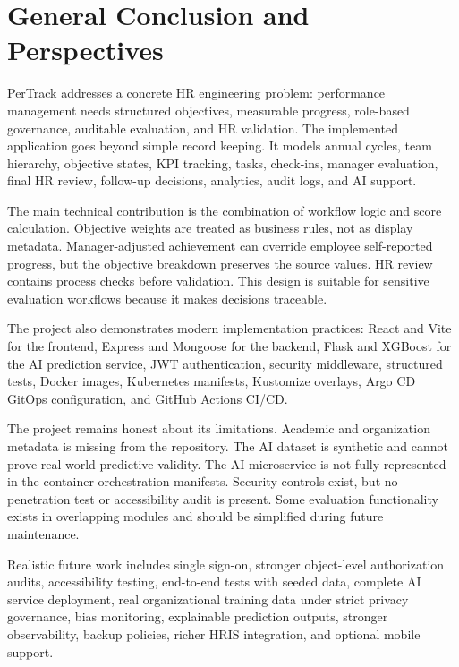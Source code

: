 \chapter*{General Conclusion and Perspectives}
PerTrack addresses a concrete HR engineering problem: performance management needs structured objectives, measurable progress, role-based governance, auditable evaluation, and HR validation. The implemented application goes beyond simple record keeping. It models annual cycles, team hierarchy, objective states, KPI tracking, tasks, check-ins, manager evaluation, final HR review, follow-up decisions, analytics, audit logs, and AI support.

The main technical contribution is the combination of workflow logic and score calculation. Objective weights are treated as business rules, not as display metadata. Manager-adjusted achievement can override employee self-reported progress, but the objective breakdown preserves the source values. HR review contains process checks before validation. This design is suitable for sensitive evaluation workflows because it makes decisions traceable.

The project also demonstrates modern implementation practices: React and Vite for the frontend, Express and Mongoose for the backend, Flask and XGBoost for the AI prediction service, JWT authentication, security middleware, structured tests, Docker images, Kubernetes manifests, Kustomize overlays, Argo CD GitOps configuration, and GitHub Actions CI/CD.

The project remains honest about its limitations. Academic and organization metadata is missing from the repository. The AI dataset is synthetic and cannot prove real-world predictive validity. The AI microservice is not fully represented in the container orchestration manifests. Security controls exist, but no penetration test or accessibility audit is present. Some evaluation functionality exists in overlapping modules and should be simplified during future maintenance.

Realistic future work includes single sign-on, stronger object-level authorization audits, accessibility testing, end-to-end tests with seeded data, complete AI service deployment, real organizational training data under strict privacy governance, bias monitoring, explainable prediction outputs, stronger observability, backup policies, richer HRIS integration, and optional mobile support.

